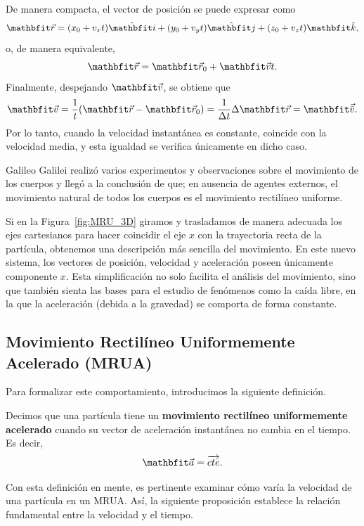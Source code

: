 \begin{proposition}{}{}
\begin{demo}
        De manera compacta, el vector de posición se puede expresar como
        $$\vecr = (x_0 + v_x t)\veci + (y_0 + v_y t)\vecj + (z_0 + v_z t)\veck,$$
        o, de manera equivalente,
        $$\vecr = \vecr_0 + \veloi t.$$
        Finalmente, despejando $\veloi$, se obtiene que
        $$\veloi = \frac{1}{t} (\vecr - \vecr_0) = \frac{1}{\Deltat} \Deltar = \velom.$$
        Por lo tanto, cuando la velocidad instantánea es constante, coincide con la velocidad media, y esta igualdad se verifica únicamente en dicho caso.
    \end{demo}
\end{proposition}

Galileo Galilei realizó varios experimentos y observaciones sobre el movimiento de los cuerpos y llegó a la conclusión de que; en ausencia de agentes externos, el movimiento natural de todos los cuerpos es el movimiento rectilíneo uniforme.

Si en la Figura~\ref{fig:MRU_3D} giramos y trasladamos de manera adecuada los ejes cartesianos para hacer coincidir el eje $x$ con la trayectoria recta de la partícula, obtenemos una descripción más sencilla del movimiento. En este nuevo sistema, los vectores de posición, velocidad y aceleración poseen únicamente componente $x$. Esta simplificación no solo facilita el análisis del movimiento, sino que también sienta las bases para el estudio de fenómenos como la caída libre, en la que la aceleración (debida a la gravedad) se comporta de forma constante.

\subsection{Movimiento Rectilíneo Uniformemente Acelerado (MRUA)}

Para formalizar este comportamiento, introducimos la siguiente definición.

\begin{definition}{}{}
    Decimos que una partícula tiene un \textbf{movimiento rectilíneo uniformemente acelerado} cuando su vector de aceleración instantánea no cambia en el tiempo. Es decir,
    $$\acei = \cte.$$
\end{definition}

Con esta definición en mente, es pertinente examinar cómo varía la velocidad de una partícula en un MRUA. Así, la siguiente proposición establece la relación fundamental entre la velocidad y el tiempo.

